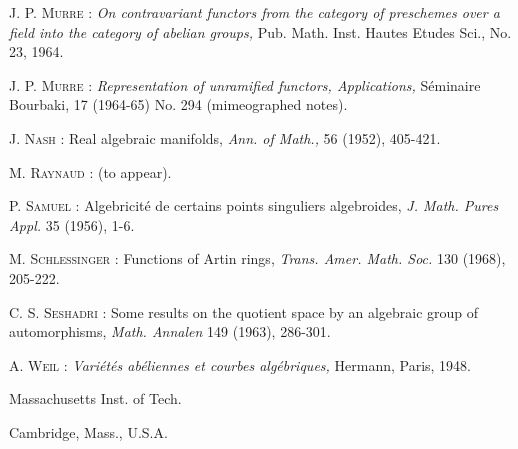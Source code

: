 \begin{thebibliography}{99}
 \textsc{J. P. Murre :} {\em On contravariant functors from the category of preschemes over a field into the category of abelian groups,} Pub. Math. Inst. Hautes Etudes Sci., No. 23, 1964.

 \textsc{J. P. Murre :} {\em Representation of unramified functors, Applications,} S\'eminaire Bourbaki, 17 (1964-65) No. 294 (mimeographed notes).

 \textsc{J. Nash :} Real algebraic manifolds, {\em Ann. of Math.,} 56 (1952), 405-421.

 \textsc{M. Raynaud :} (to appear).

 \textsc{P. Samuel :} Algebricit\'e de certains points singuliers algebroides, {\em J. Math. Pures Appl.} 35 (1956), 1-6.

 \textsc{M. Schlessinger :} Functions of Artin rings, {\em Trans. Amer. Math. Soc.} 130 (1968), 205-222.

 \textsc{C. S. Seshadri :} Some results on the quotient space by an algebraic group of automorphisms, {\em Math. Annalen} 149 (1963), 286-301.

 \textsc{A. Weil :} {\em Vari\'et\'es ab\'eliennes et courbes alg\'ebriques,} Hermann, Paris, 1948.
\end{thebibliography}


\bigskip
\noindent
Massachusetts Inst. of Tech.

\noindent
Cambridge, Mass., U.S.A.

